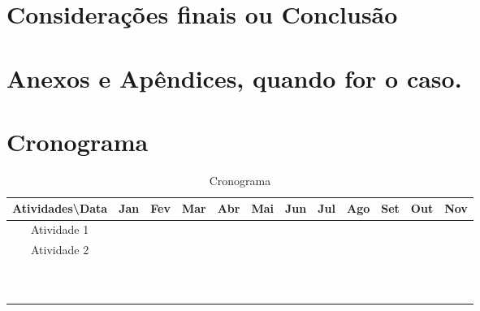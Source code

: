 \documentclass[12pt,oneside,a4paper,chapter=TITLE,english,brazil,sumario=abnt-6027-2012]{abntex2}
\begin{document}
\chapter{Considerações finais ou Conclusão}








\apendices

\chapter{Anexos e Apêndices, quando for o caso.}

\chapter{Cronograma}

\begin{table}[H]
	\centering
	\caption{Cronograma}
	\begin{tabular}{|c|c|c|c|c|c|c|c|c|c|c|c|}
		\toprule
		Atividades\textbackslash{}Data & Jan   & Fev   & Mar   & Abr   & Mai   & Jun   & Jul   & Ago   & Set   & Out   & Nov \\
		\midrule
		Atividade 1 &       &       &       &       &       &       &       &       &       &       &  \\
		\midrule
		Atividade 2 &       &       &       &       &       &       &       &       &       &       &  \\
		\midrule
		&       &       &       &       &       &       &       &       &       &       &  \\
		\midrule
		&       &       &       &       &       &       &       &       &       &       &  \\
		\midrule
		&       &       &       &       &       &       &       &       &       &       &  \\
		\midrule
		&       &       &       &       &       &       &       &       &       &       &  \\
		\midrule
		&       &       &       &       &       &       &       &       &       &       &  \\
		\midrule
		&       &       &       &       &       &       &       &       &       &       &  \\
		\midrule
		&       &       &       &       &       &       &       &       &       &       &  \\
		\midrule
		&       &       &       &       &       &       &       &       &       &       &  \\
		\midrule
		&       &       &       &       &       &       &       &       &       &       &  \\
		\midrule
		&       &       &       &       &       &       &       &       &       &       &  \\
		\bottomrule
	\end{tabular}%
	\label{tab:addlabel}%
\end{table}%
\end{document}
